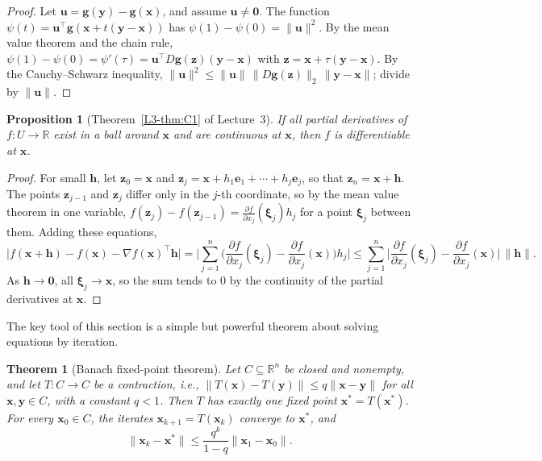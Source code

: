 \documentclass[11pt]{article}
\newcommand{\norm}[1]{\lVert #1 \rVert}
\theoremstyle{definition}
\theoremstyle{plain}
\newtheorem{theorem}[definition]{Theorem}
\newtheorem{proposition}[definition]{Proposition}
\theoremstyle{remark}
\begin{document}
\begin{proof}
    Let $\mathbf{u} = \mathbf{g}(\mathbf{y}) - \mathbf{g}(\mathbf{x})$, and assume $\mathbf{u} \neq \mathbf{0}$. The function $\psi(t) = \mathbf{u}^\top\mathbf{g}(\mathbf{x} + t(\mathbf{y} - \mathbf{x}))$ has $\psi(1) - \psi(0) = \norm{\mathbf{u}}^2$. By the mean value theorem and the chain rule, $\psi(1) - \psi(0) = \psi'(\tau) = \mathbf{u}^\top D\mathbf{g}(\mathbf{z})(\mathbf{y} - \mathbf{x})$ with $\mathbf{z} = \mathbf{x} + \tau(\mathbf{y} - \mathbf{x})$. By the Cauchy--Schwarz inequality, $\norm{\mathbf{u}}^2 \leq \norm{\mathbf{u}}\,\norm{D\mathbf{g}(\mathbf{z})}_2\,\norm{\mathbf{y} - \mathbf{x}}$; divide by $\norm{\mathbf{u}}$.
\end{proof}

\begin{proposition}[Theorem~\ref{L3-thm:C1} of Lecture~3]\label{prop:C1}
    If all partial derivatives of $f: U \to \mathbb{R}$ exist in a ball around $\mathbf{x}$ and are continuous at $\mathbf{x}$, then $f$ is differentiable at $\mathbf{x}$.
\end{proposition}

\begin{proof}
    For small $\mathbf{h}$, let $\mathbf{z}_0 = \mathbf{x}$ and $\mathbf{z}_j = \mathbf{x} + h_1\mathbf{e}_1 + \cdots + h_j\mathbf{e}_j$, so that $\mathbf{z}_n = \mathbf{x} + \mathbf{h}$. The points $\mathbf{z}_{j-1}$ and $\mathbf{z}_j$ differ only in the $j$-th coordinate, so by the mean value theorem in one variable, $f(\mathbf{z}_j) - f(\mathbf{z}_{j-1}) = \frac{\partial f}{\partial x_j}(\boldsymbol{\xi}_j)h_j$ for a point $\boldsymbol{\xi}_j$ between them. Adding these equations,
    \[\big|f(\mathbf{x} + \mathbf{h}) - f(\mathbf{x}) - \nabla f(\mathbf{x})^\top\mathbf{h}\big| = \Big|\sum_{j=1}^n \Big(\frac{\partial f}{\partial x_j}(\boldsymbol{\xi}_j) - \frac{\partial f}{\partial x_j}(\mathbf{x})\Big)h_j\Big| \leq \sum_{j=1}^n \Big|\frac{\partial f}{\partial x_j}(\boldsymbol{\xi}_j) - \frac{\partial f}{\partial x_j}(\mathbf{x})\Big| \, \norm{\mathbf{h}}.\]
    As $\mathbf{h} \to \mathbf{0}$, all $\boldsymbol{\xi}_j \to \mathbf{x}$, so the sum tends to $0$ by the continuity of the partial derivatives at $\mathbf{x}$.
\end{proof}

The key tool of this section is a simple but powerful theorem about solving equations by iteration.

\begin{theorem}[Banach fixed-point theorem]\label{thm:banach}
    Let $C \subseteq \mathbb{R}^n$ be closed and nonempty, and let $T: C \to C$ be a contraction, i.e., $\norm{T(\mathbf{x}) - T(\mathbf{y})} \leq q\norm{\mathbf{x} - \mathbf{y}}$ for all $\mathbf{x}, \mathbf{y} \in C$, with a constant $q < 1$. Then $T$ has exactly one fixed point $\mathbf{x}^* = T(\mathbf{x}^*)$. For every $\mathbf{x}_0 \in C$, the iterates $\mathbf{x}_{k+1} = T(\mathbf{x}_k)$ converge to $\mathbf{x}^*$, and
    \[\norm{\mathbf{x}_k - \mathbf{x}^*} \leq \frac{q^k}{1 - q}\norm{\mathbf{x}_1 - \mathbf{x}_0}.\]
\end{theorem}
\end{document}
